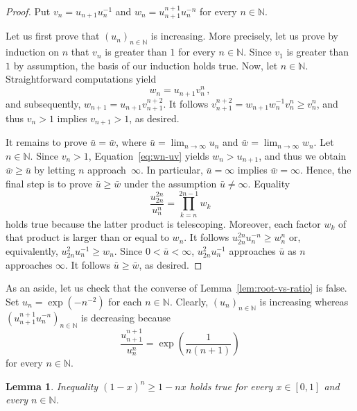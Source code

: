 \documentclass[12pt]{article}
\newcommand{\bN}{\mathbb{N}} %
\newtheorem{lemma}{Lemma}
\begin{document}
\begin{proof}
 Put
  $v_n = u_{n + 1} u_n^{-1}$
  and
  $w_n = u_{n + 1}^{n + 1} u_n^{- n}$
  for every $n \in \bN$.
  
  Let us first prove that $\left( u_n \right)_{n \in \bN}$ is increasing.
  More precisely, let us prove by induction on $n$ that $v_n$ is greater than $1$ for every $n \in \bN$.
  Since $v_1$ is greater than $1$ by assumption,
  the basis of our induction holds true.
  Now, let $n \in \bN$. %
  Straightforward computations yield
  \begin{equation} \label{eq:wn-uv}
    w_n = u_{n + 1}v_n^n \,, 
  \end{equation} 
  and subsequently, 
  $w_{n + 1} = u_{n + 1} v_{n + 1}^{n + 2}$.
  It follows  
  $v_{n + 1}^{n + 2}= w_{n + 1}w_n^{-1} v_n^n \ge v_n^n$,
  and thus $v_n > 1$ implies $v_{n + 1} > 1$, as desired.

  It remains to prove $\bar u = \bar w$, where 
  $\bar u = \lim_{n \to \infty} u_n$ and 
  $\bar w = \lim_{n \to \infty} w_n$.
  Let $n \in \bN$.
  Since $v_n > 1$,
  Equation~\eqref{eq:wn-uv} yields $w_n > u_{n + 1}$,
  and thus we obtain $\bar w \ge \bar u$ by letting $n$ approach~$\infty$.
  In particular, $\bar u = \infty$ implies $\bar w = \infty$.
  Hence, the final step is to prove $\bar u \ge \bar w$ under the assumption $\bar u \ne \infty$.
  Equality 
  $$
  \frac{u_{2n}^{2n}}{ u_n^n} =  \prod_{k = n}^{2n - 1} w_k
  $$
  holds true because the latter product is telescoping.
  Moreover, each factor $w_k$ of that product is larger than or equal to $w_n$.
  It follows 
  $u_{2n}^{2n} u_n^{-n} \ge w_n^n$ 
  or, equivalently,
  $u_{2n}^2u_n^{- 1}  \ge  w_n$.
  Since $0 < \bar u < \infty$, 
  $u_{2n}^2 u_n^{-1}$ approaches $\bar u$ as $n$ approaches $\infty$.
  It follows $\bar u \ge \bar w$, as desired.
\end{proof}

As an aside, let us check that the converse of Lemma~\ref{lem:root-vs-ratio} is false.
Set $ u_n = \exp \left( - n^{- 2} \right)$ for each $n \in \bN$.
Clearly,  $\left( u_n \right)_{n \in \bN}$  is increasing whereas
$\left(  u_{n + 1}^{n + 1}  u_n^{-n} \right)_{n \in \bN}$ is decreasing because 
$$
\frac{u_{n + 1}^{n + 1}}{u_n^n} = \exp \left(\frac{1}{n (n + 1)} \right) 
$$
for every $n \in \bN$.

\begin{lemma} \label{lem:Bernoulli}
   Inequality ${(1 - x)}^n \ge  1 - n x$ 
   holds true for every $x \in [0, 1]$ and every $n \in \bN$.
\end{lemma} 
\end{document}

